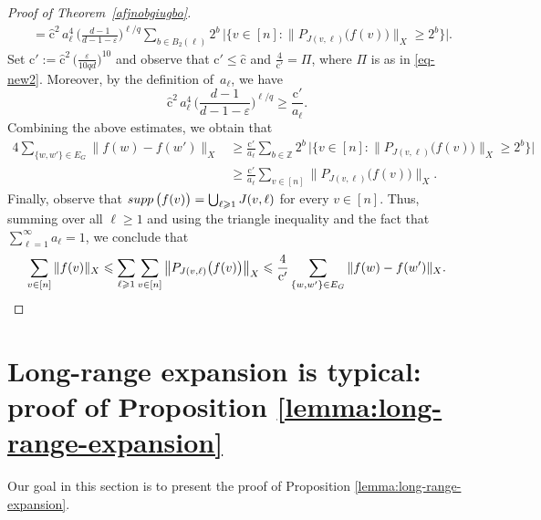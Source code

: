 \documentclass[11pt,leqno]{amsart}
\theoremstyle{remark}
\theoremstyle{plain}
\newcommand{\Z}{\mathbb{Z}}
\newcommand{\supp}{{\rm supp\,}}
\begin{document}
\begin{proof}[Proof of Theorem~\ref{afjnobgiugbo}]
\begin{align*}
&=
\hat{\mathrm{c}}^2\,a_\ell^4\,\bigg(\frac{d-1}{d-1-\varepsilon}\bigg)^{\ell/q}
\sum\limits_{b\in B_2(\ell)}
2^b\,\big|\big\{v\in[n]\colon \big\|P_{J(v,\ell)}\big(f(v)\big)\big\|_X\geqslant 2^b\big\}
\big|.
\end{align*}
Set $\mathrm{c}':= \hat{\mathrm{c}}^2\, \big(\frac{\varepsilon}{10qd}\big)^{10}$ and observe that
$\mathrm{c}'\leqslant \hat{\mathrm{c}}$ and $\frac{4}{\mathrm{c}'}=\Pi$, where $\Pi$ is as in \eqref{eq-new2}.
Moreover, by the definition of~$a_\ell$, we have
$$ \hat{\mathrm{c}}^2\,a_\ell^4\,\bigg(\frac{d-1}{d-1-\varepsilon}\bigg)^{\ell/q}
\geqslant \frac{\mathrm{c}'}{a_\ell}. $$
Combining the above estimates, we obtain that
\begin{align*}
4\sum_{\{w,w'\}\in E_G}\|f(w)-f(w')\|_X
&\geqslant \frac{\mathrm{c}'}{a_\ell}
\sum\limits_{b\in \Z} 2^b\,\big|\big\{v\in[n]\colon \big\|P_{J(v,\ell)}\big(f(v)\big)\big\|_X \geqslant 2^b\big\} \big|\\
&\geqslant \frac{\mathrm{c}'}{a_\ell} \sum\limits_{v\in[n]} \big\|P_{J(v,\ell)}\big(f(v)\big)\big\|_X.
\end{align*}
Finally, observe that $\supp\big(f(v)\big)=\bigcup_{\ell\geqslant 1} J(v,\ell)$ for every $v\in [n]$.
Thus, summing over all $\ell\geqslant 1$ and using the triangle inequality and the fact that $\sum_{\ell=1}^\infty a_\ell=1$,
we conclude that
\[ \sum\limits_{v\in[n]} \|f(v)\|_X\leqslant
\sum\limits_{\ell\geqslant 1} \sum\limits_{v\in[n]} \big\|P_{J(v,\ell)}\big(f(v)\big)\big\|_X
\leqslant \frac{4}{\mathrm{c}'}\sum_{\{w,w'\}\in E_G}\|f(w)-f(w')\|_X. \qedhere\]
\end{proof}

\section{Long-range expansion is typical: proof of Proposition \ref*{lemma:long-range-expansion}} \label{sec5}

Our goal in this section is to present the proof of Proposition \ref{lemma:long-range-expansion}.
\end{document}
